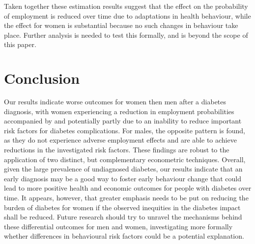 Taken together these estimation results suggest that the effect on the probability of employment is reduced over time due to adaptations in health behaviour, while the effect for women is substantial because no such changes in behaviour take place. Further analysis is needed to test this formally, and is beyond the scope of this paper.





\section{Conclusion}

Our results indicate worse outcomes for women then men after a diabetes diagnosis, with women experiencing a reduction in employment probabilities accompanied by and potentially partly due to an inability to reduce important risk factors for diabetes complications. For males, the opposite pattern is found, as they do not experience adverse employment effects and are able to achieve reductions in the investigated risk factors. These findings are robust to the application of two distinct, but complementary econometric techniques. Overall, given the large prevalence of undiagnosed diabetes, our results indicate that an early diagnosis may be a good way to foster early behaviour change that could lead to more positive health and economic outcomes for people with diabetes over time. It appears, however, that greater emphasis needs to be put on reducing the burden of diabetes for women if the observed inequities in the diabetes impact shall be reduced. Future research should try to unravel the mechanisms behind these differential outcomes for men and women, investigating more formally whether differences in behavioural risk factors could be a potential explanation.

\clearpage
